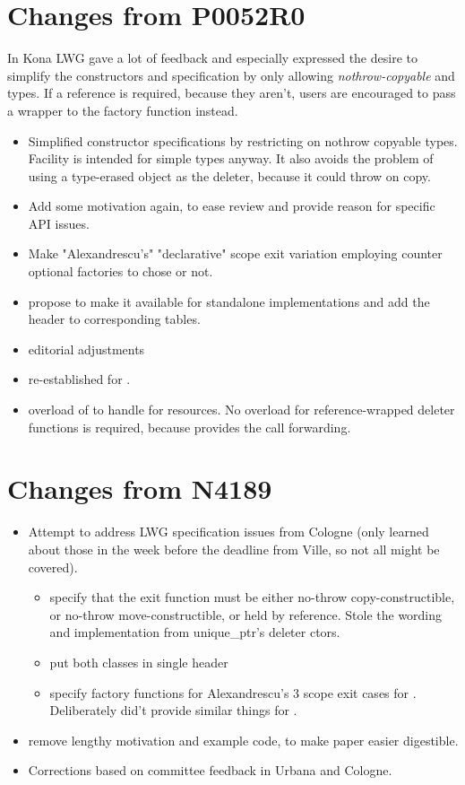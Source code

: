 \documentclass[ebook,11pt,article]{memoir}
\begin{document}
\section{Changes from P0052R0}
In Kona LWG gave a lot of feedback and especially expressed the desire to simplify the constructors and specification by only allowing \emph{nothrow-copyable}  and  types. If a reference is required, because they aren't, users are encouraged to pass a  wrapper to the factory function instead.
\begin{itemize}
\item Simplified constructor specifications by restricting on nothrow copyable types. Facility is intended for simple types anyway. It also avoids the problem of using a type-erased  object as the deleter, because it could throw on copy.
\item Add some motivation again, to ease review and provide reason for specific API issues.
\item Make "Alexandrescu's" "declarative" scope exit variation employing  counter optional factories to chose or not.
\item propose to make it available for standalone implementations and add the header  to corresponding tables.
\item editorial adjustments
\item re-established  for .
\item overload of  to handle  for resources. No overload for reference-wrapped deleter functions is required, because  provides the call forwarding.
\end{itemize}

\section{Changes from N4189}
\begin{itemize}
\item Attempt to address LWG specification issues from Cologne (only learned about those in the week before the deadline from Ville, so not all might be covered).
\begin{itemize}
\item specify that the exit function must be either no-throw copy-constructible, or no-throw move-constructible, or held by reference. Stole the wording and implementation from unique_ptr's deleter ctors.
\item put both classes in single header 
\item specify factory functions for Alexandrescu's 3 scope exit cases for . Deliberately did't provide similar things for .
\end{itemize}
\item remove lengthy motivation and example code, to make paper easier digestible.
\item Corrections based on committee feedback in Urbana and Cologne.
\end{itemize}
\end{document}
